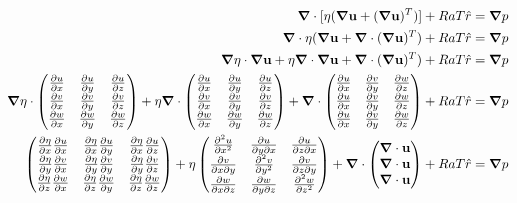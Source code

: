 \begin{align}
\div{[\eta(\grad{\vu} + (\grad{\vu})^T)]} + Ra T \hat{r} & = \grad{p} \label{eq:stokes_momentum} \\
\div{\eta(\grad{\vu}} + \div{(\grad{\vu})^T)} + Ra T \hat{r} & = \grad{p} \\
\grad{\eta} \cdot \grad{\vu} + \eta \div{\grad{\vu}} + \div{(\grad{\vu})^T)} + Ra T \hat{r} & = \grad{p} \\
\grad{\eta} \cdot \begin{pmatrix} \pd{u}{x} & \pd{u}{y} & \pd{u}{z} \\ \pd{v}{x} & \pd{v}{y} & \pd{v}{z} \\ \pd{w}{x} & \pd{w}{y} & \pd{w}{z} \end{pmatrix} + \eta \div{\begin{pmatrix} \pd{u}{x} & \pd{u}{y} & \pd{u}{z} \\ \pd{v}{x} & \pd{v}{y} & \pd{v}{z} \\ \pd{w}{x} & \pd{w}{y} & \pd{w}{z} \end{pmatrix}} + \div{\begin{pmatrix} \pd{u}{x} & \pd{v}{y} & \pd{w}{z} \\ \pd{u}{x} & \pd{v}{y} & \pd{w}{z} \\ \pd{u}{x} & \pd{v}{y} & \pd{w}{z} \end{pmatrix}} + Ra T \hat{r} & = \grad{p} \\
\begin{pmatrix} \pd{\eta}{x} \pd{u}{x} & \pd{\eta}{x} \pd{u}{y} & \pd{\eta}{x} \pd{u}{z} \\ \pd{\eta}{y} \pd{v}{x} & \pd{\eta}{y} \pd{v}{y} & \pd{\eta}{y} \pd{v}{z} \\ \pd{\eta}{z} \pd{w}{x} & \pd{\eta}{z} \pd{w}{y} & \pd{\eta}{z} \pd{w}{z} \end{pmatrix} + \eta \begin{pmatrix} \pdd{u}{x} & \pd{u}{y \partial x} & \pd{u}{z \partial x} \\ \pd{v}{x \partial y} & \pdd{v}{y} & \pd{v}{z \partial y} \\ \pd{w}{x \partial z} & \pd{w}{y \partial z} & \pdd{w}{z} \end{pmatrix} + \div{\begin{pmatrix} \div{\vu} \\ \div{\vu} \\ \div{\vu} \end{pmatrix}} + Ra T \hat{r} & = \grad{p} \\

\end{align}
